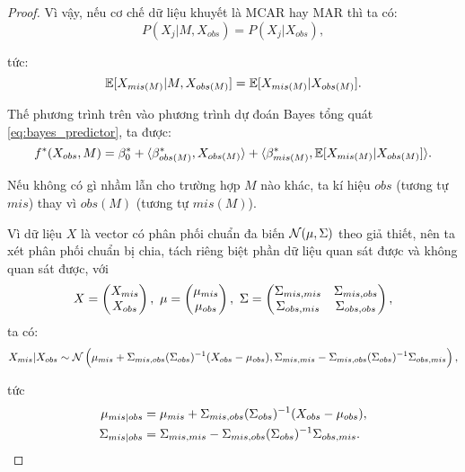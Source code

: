 \begin{proof}
    Vì vậy, nếu cơ chế dữ liệu khuyết là MCAR hay MAR thì ta có:
    \[
        P(X_j|M, X_{obs}) = P(X_j | X_{obs}),
    \]

    tức:
    \begin{equation*}
        \mathbb{E} [X_{mis(M)} | M, X_{obs(M)}] = \mathbb{E} [X_{mis(M)} | X_{obs(M)}].
    \end{equation*}

    Thế phương trình trên vào phương trình dự đoán Bayes tổng quát \eqref{eq:bayes_predictor}, ta được:
    \begin{equation}\label{eq:bayes_predictor_without_M}
        f^* (X_{obs}, M) = 
        \beta_{0}^{*} + \langle\beta_{obs(M)}^{*}, X_{obs(M)}\rangle 
        + \langle\beta_{mis(M)}^{*}, \mathbb{E} [X_{mis(M)} | X_{obs(M)}]\rangle.
    \end{equation}

    Nếu không có gì nhầm lẫn cho trường hợp $M$ nào khác, ta kí hiệu $obs$ (tương tự $mis$) thay vì $obs(M)$ (tương tự $mis(M)$).


    Vì dữ liệu $X$ là vector có phân phối chuẩn đa biến $\mathcal{N}(\mu, \Sigma)$ theo giả thiết, nên ta 
    xét phân phối chuẩn bị chia, 
    tách riêng biệt phần dữ liệu quan sát được và không quan sát được, với 
    \[
        X = \begin{pmatrix}
            X_{mis} \\
            X_{obs}
        \end{pmatrix}, \ 
        \mu = \begin{pmatrix}
            \mu_{mis} \\
            \mu_{obs}
        \end{pmatrix}, \ 
        \cov = \begin{pmatrix}
            \cov_{mis, mis} & \cov_{mis, obs}\\
            \cov_{obs, mis} & \cov_{obs, obs}
        \end{pmatrix},
    \]
    ta có:
    \[
        X_{mis} | X_{obs} \sim 
        \mathcal{N} \left( \mu_{mis} + \Sigma_{mis,obs} (\Sigma_{obs})^{-1} (X_{obs} - \mu_{obs}), 
        \Sigma_{mis,mis} - \Sigma_{mis,obs} (\Sigma_{obs})^{-1} \Sigma_{obs,mis} \right),
    \]

    tức
    \begin{align*}
            \mu_{mis|obs} &= \mu_{mis} + \Sigma_{mis,obs} (\Sigma_{obs})^{-1} (X_{obs} - \mu_{obs}), \\
            \Sigma_{mis|obs} &= \Sigma_{mis,mis} - \Sigma_{mis,obs} (\Sigma_{obs})^{-1} \Sigma_{obs,mis}.
    \end{align*} 


\end{proof}
